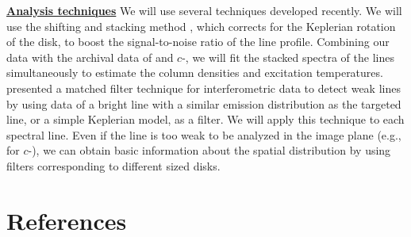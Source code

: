 \documentclass[12pt,a4paper]{article}  %
\begin{document}
\smallskip
\noindent
\textbf{\underline{Analysis techniques}}
We will use several techniques developed recently. We will use the shifting and stacking method \cite[e.g.,][]{Yen16}, which corrects for the Keplerian rotation of the disk, to boost the signal-to-noise ratio of the line profile. Combining our data with the archival data of  and $c$-, we will fit the stacked spectra of the lines simultaneously to estimate the column densities and excitation temperatures. \citet{Loomis18} presented a matched filter technique for interferometric data to detect weak lines by using data of a bright line with a similar emission distribution as the targeted line, or a simple Keplerian model, as a filter. We will apply this technique to each spectral line. Even if the line is too weak to be analyzed in the image plane (e.g., for $c$-), we can obtain basic information about the spatial distribution by using filters corresponding to different sized disks. 



\vspace{-1em}
\section*{References}








\end{document}
